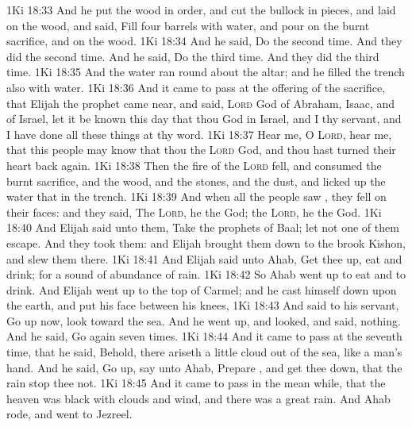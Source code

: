 \vs 1Ki 18:33 And he put the wood in order, and cut the bullock in pieces, and laid  on the wood, and said, Fill four barrels with water, and pour  on the burnt sacrifice, and on the wood.
\vs 1Ki 18:34 And he said, Do  the second time. And they did  the second time. And he said, Do  the third time. And they did  the third time.
\vs 1Ki 18:35 And the water ran round about the altar; and he filled the trench also with water.
\vs 1Ki 18:36 And it came to pass at  the offering of the  sacrifice, that Elijah the prophet came near, and said, \textsc{Lord} God of Abraham, Isaac, and of Israel, let it be known this day that thou  God in Israel, and  I  thy servant, and  I have done all these things at thy word.
\vs 1Ki 18:37 Hear me, O \textsc{Lord}, hear me, that this people may know that thou  the \textsc{Lord} God, and  thou hast turned their heart back again.
\vs 1Ki 18:38 Then the fire of the \textsc{Lord} fell, and consumed the burnt sacrifice, and the wood, and the stones, and the dust, and licked up the water that  in the trench.
\vs 1Ki 18:39 And when all the people saw , they fell on their faces: and they said, The \textsc{Lord}, he  the God; the \textsc{Lord}, he  the God.
\vs 1Ki 18:40 And Elijah said unto them, Take the prophets of Baal; let not one of them escape. And they took them: and Elijah brought them down to the brook Kishon, and slew them there.
\vs 1Ki 18:41 And Elijah said unto Ahab, Get thee up, eat and drink; for  a sound of abundance of rain.
\vs 1Ki 18:42 So Ahab went up to eat and to drink. And Elijah went up to the top of Carmel; and he cast himself down upon the earth, and put his face between his knees,
\vs 1Ki 18:43 And said to his servant, Go up now, look toward the sea. And he went up, and looked, and said,  nothing. And he said, Go again seven times.
\vs 1Ki 18:44 And it came to pass at the seventh time, that he said, Behold, there ariseth a little cloud out of the sea, like a man's hand. And he said, Go up, say unto Ahab, Prepare , and get thee down, that the rain stop thee not.
\vs 1Ki 18:45 And it came to pass in the mean while, that the heaven was black with clouds and wind, and there was a great rain. And Ahab rode, and went to Jezreel.
